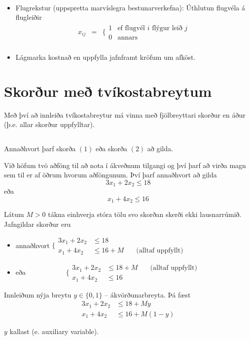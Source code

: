 \begin{itemize}
\begin{eqnarray*}
  \end{eqnarray*}
  \item Flugrekstur (uppspretta marvíslegra bestunarverkefna): Úthlutun flugvéla á flugleiðir
  \begin{eqnarray*}
    x_{ij}&=&\Bigg\{\begin{array}{cl} 1 & \mbox{ef flugvél }i\mbox{ flýgur leið }j\\0 & \mbox{annars}\end{array}\\
  \end{eqnarray*}
  \item Lágmarka kostnað en uppfylla jafnframt kröfum um afköst.
\end{itemize}

\section{Skorður með tvíkostabreytum}
Með því að innleiða tvíkostabreytur má vinna með fjölbreyttari skorður en áður (þ.e. allar skorður uppfylltar).

\subsection{}
Annaðhvort þarf skorða $(1)$ eða skorða $(2)$ að gilda.
\begin{daemi} Við höfum tvö aðföng til að nota í ákveðnum tilgangi og því þarf að virða magn sem til er af öðrum hvorum aðföngunum. Því þarf annaðhvort að gilda 
\[ 3 x_1 + 2 x_2  \le 18 \]
eða
\[ x_1 + 4 x_2  \le 16\]

\end{daemi}
\begin{lausn}Látum $M>0$ tákna einhverja stóra tölu svo skorðan skerði ekki lausnarrúmið. Jafngildar skorður eru
\begin{itemize}
  \item annaðhvort $\Bigg\{\begin{array}{rll} 3 x_1 + 2 x_2  &\le 18 \\ x_1 + 4 x_2  &\le 16+M & \quad\mbox{(alltaf uppfyllt)}\end{array}$
  \item eða~~~~~~~~~~~ $\Bigg\{\begin{array}{rll} 3 x_1 + 2 x_2  &\le 18+M& \quad\mbox{(alltaf uppfyllt)} \\ x_1 + 4 x_2  &\le 16 \end{array}$
\end{itemize}
Innleiðum nýja breytu $y\in\{0,1\}$ -- ákvörðunarbreyta. Þá fæst
\[ \begin{array}{rll} 3 x_1 + 2 x_2  &\le 18+My \\ x_1 + 4 x_2  &\le 16+M(1-y) \end{array}\]
\begin{aths} $y$ kallast  (e. auxiliary variable).\end{aths}
\end{lausn}

